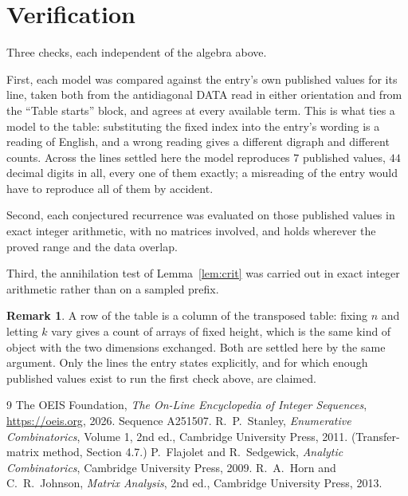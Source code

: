 \documentclass[11pt,a4paper]{article}
\theoremstyle{plain}
\theoremstyle{definition}
\newtheorem{remark}[theorem]{Remark}
\begin{document}
\section{Verification}

Three checks, each independent of the algebra above.

First, each model was compared against the entry's own published values for its line, taken
both from the antidiagonal DATA read in either orientation and from the ``Table starts''
block, and agrees at every available term. This is what ties a model to the table:
substituting the fixed index into the entry's wording is a reading of English, and a wrong
reading gives a different digraph and different counts. Across the lines settled here the
model reproduces $7$ published values, $44$ decimal digits in all, every one of
them exactly; a misreading of the entry would have to reproduce all of them by accident.

Second, each conjectured recurrence was evaluated on those published values in exact
integer arithmetic, with no matrices involved, and holds wherever the proved range and the
data overlap.

Third, the annihilation test of Lemma~\ref{lem:crit} was carried out in exact integer
arithmetic rather than on a sampled prefix.

\begin{remark}
A row of the table is a column of the transposed table: fixing $n$ and letting $k$ vary gives a
count of arrays of fixed height, which is the same kind of object with the two dimensions
exchanged. Both are settled here by the same argument. Only the lines the entry states
explicitly, and for which enough published values exist to run the first check above, are
claimed.
\end{remark}

\begin{thebibliography}{9}
 The OEIS Foundation, \emph{The On-Line Encyclopedia of Integer
Sequences}, \url{https://oeis.org}, 2026. Sequence A251507.
 R.~P.~Stanley, \emph{Enumerative Combinatorics}, Volume 1, 2nd ed.,
Cambridge University Press, 2011. (Transfer-matrix method, Section 4.7.)
 P.~Flajolet and R.~Sedgewick, \emph{Analytic Combinatorics}, Cambridge
University Press, 2009.
 R.~A.~Horn and C.~R.~Johnson, \emph{Matrix Analysis}, 2nd ed., Cambridge
University Press, 2013.
\end{thebibliography}
\end{document}
